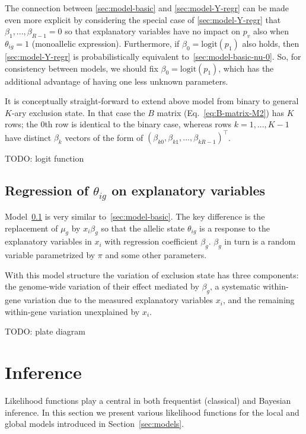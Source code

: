 \documentclass[letterpaper]{article}
\begin{document}
The connection between \ref{sec:model-basic} and \ref{sec:model-Y-regr} can be
made even more explicit by considering the special case of
\ref{sec:model-Y-regr} that \(\beta_1,...,\beta_{R-1}=0\) so that explanatory
variables have no impact on \(p_v\) also when \(\theta_{ig}=1\) (monoallelic
expression).  Furthermore, if \(\beta_0=\mathrm{logit}(p_1)\) also holds, then
\ref{sec:model-Y-regr} is probabilistically equivalent
to~\ref{sec:model-basic-nu-0}.  So, for consistency between models, we should
fix \(\beta_0=\mathrm{logit}(p_1)\), which has the additional advantage of
having one less unknown parameters.

It is conceptually straight-forward to extend above model from binary to
general \(K\)-ary exclusion state.  In that case the \(B\) matrix
(Eq.~\ref{eq:B-matrix-M2}) has \(K\) rows; the \(0\)th row is identical to the
binary case, whereas rows \(k=1,...,K-1\) have distinct \(\beta_k\) vectors
of the form of \((\beta_{k0},\beta_{k1},...,\beta_{kR-1})^\top\).

TODO: logit function

\subsection{Regression of \(\theta_{ig}\) on explanatory variables }
\label{sec:model-theta-regr}

Model~\ref{sec:model-theta-regr} is very similar to~\ref{sec:model-basic}.
The key difference is the replacement of \(\mu_g\) by \(x_i \beta_{g}\) so
that the allelic state \(\theta_{ig}\) is a response to the explanatory
variables in \(x_i\) with regression coefficient \(\beta_g\).  \(\beta_g\) in
turn is a random variable parametrized by \(\pi\) and some other parameters.

With this model structure the variation of exclusion state has three
components: the genome-wide variation of their effect mediated by \(\beta_g\),
a systematic within-gene variation due to the measured explanatory variables
\(x_i\), and the remaining within-gene variation unexplained by \(x_i\).

TODO: plate diagram

\renewcommand{\thesubsection}{\arabic{section}.\arabic{subsection}}
\section{Inference}
\label{sec:likelihood}

Likelihood functions play a central in both frequentist (classical) and
Bayesian inference.  In this section we present various likelihood functions
for the local and global models introduced in Section~\ref{sec:models}.
\end{document}
